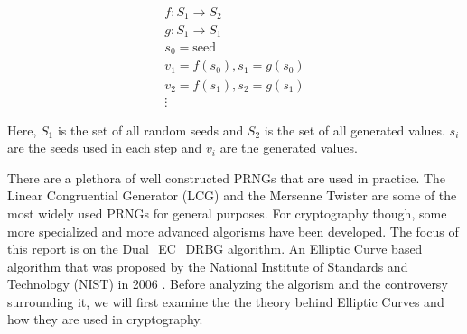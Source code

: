 \begin{gather}
    f: S_1 \rightarrow S_2 \\
    g : S_1 \rightarrow S_1\\
    s_0 = \text{seed}\\
    v_1 = f(s_0), s_1 = g(s_0) \nonumber\\
    v_2 = f(s_1), s_2 = g(s_1) \nonumber\\
    \vdots \nonumber
\end{gather}

\noindent
Here, $S_1$ is the set of all random seeds and $S_2$ is the set of all generated values. $s_i$ are the seeds used in each step and $v_i$ are the generated values.

There are a plethora of well constructed PRNGs that are used in practice. The Linear Congruential Generator (LCG) and the Mersenne Twister are some of the most widely used PRNGs for general purposes. For cryptography though, some more specialized and more advanced algorisms have been developed. The focus of this report is on the Dual\_EC\_DRBG algorithm. An Elliptic Curve based algorithm that was proposed by the National Institute of Standards and Technology (NIST) in 2006 \cite{nist-sp800-90}. Before analyzing the algorism and the controversy surrounding it, we will first examine the the theory behind Elliptic Curves and how they are used in cryptography.
